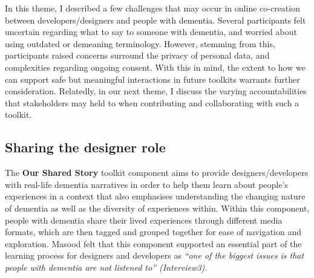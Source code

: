 In this theme, I described a few challenges that may occur in online co-creation between developers/designers and people with dementia. Several participants felt uncertain regarding what to say to someone with dementia, and worried about using outdated or demeaning terminology. However, stemming from this, participants raised concerns surround the privacy of personal data, and complexities regarding ongoing consent. With this in mind, the extent to how we can support safe but meaningful interactions in future toolkits warrants further consideration. Relatedly, in our next theme, I discuss the varying accountabilities that stakeholders may held to when contributing and collaborating with such a toolkit.

\subsection{Sharing the designer role}
The \textbf{Our Shared Story} toolkit component aims to provide designers/developers with real-life dementia narratives in order to help them learn about people’s experiences in a context that also emphasises understanding the changing nature of dementia as well as the diversity of experiences within. Within this component, people with dementia share their lived experiences through different media formats, which are then tagged and grouped together for ease of navigation and exploration. Masood felt that this component supported an essential part of the learning process for designers and developers as \textit{``one of the biggest issues is that people with dementia are not listened to'' (Interview3)}. 

